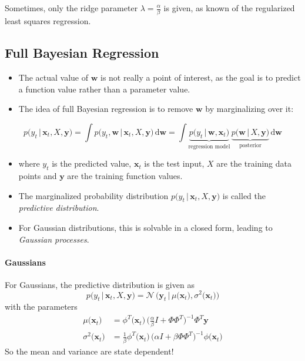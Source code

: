 \documentclass[a4paper, 11pt, accentcolor = tud3b]{tudreport}
\newcommand{\given}{\ensuremath{\,\vert\,}}
\newcommand{\dif}[1]{\ensuremath{\,\mathrm{d}#1}}
\renewcommand{\vec}[1]{\mathbf{#1}}
\begin{document}
				Sometimes, only the ridge parameter \(\lambda = \frac{\alpha}{\beta}\) is given, as known of the regularized least squares regression.

			\subsection{Full Bayesian Regression}
				\begin{itemize}
					\item The actual value of \(\vec{w}\) is not really a point of interest, as the goal is to predict a function value rather than a parameter value.
					\item The idea of full Bayesian regression is to remove \(\vec{w}\) by marginalizing over it:
				\end{itemize}
				\begin{equation}
					p\big(y_t \given \vec{x}_t, X, \vec{y}\big) = \int p\big(y_t, \vec{w} \given \vec{x}_t, X, \vec{y}\big) \dif{\vec{w}} = \int \underbrace{p\big(y_t \given \vec{w}, \vec{x}_t\big)}_\textrm{regression model} \, \underbrace{p\big(\vec{w} \given X, \vec{y}\big)}_\textrm{posterior} \dif{\vec{w}}
				\end{equation}
				\begin{itemize}
					\item[] where \( y_t \) is the predicted value, \( \vec{x}_t \) is the test input, \(X\) are the training data points and \(\vec{y}\) are the training function values.
					\item The marginalized probability distribution \( p\big(y_t \given \vec{x}_t, X, \vec{y}\big) \) is called the \emph{predictive distribution}.
					\item For Gaussian distributions, this is solvable in a closed form, leading to \emph{Gaussian processes}.
				\end{itemize}

				\paragraph{Gaussians}
					For Gaussians, the predictive distribution is given as
					\begin{equation}
						p\big(y_t \given \vec{x}_t, X, \vec{y}\big) = \mathcal{N}\,\Big(\vec{y}_t \given \mu\big(\vec{x}_t\big), \sigma^2\big(\vec{x}_t\big)\Big)
					\end{equation}
					with the parameters
					\begin{align}
						\mu\big(\vec{x}_t\big) &= \phi^T\big(\vec{x}_t\big) \, \Bigg( \frac{\alpha}{\beta} I + \Phi\Phi^T \!\Bigg)^{-1} \Phi^T \vec{y} \\
						\sigma^2\big(\vec{x}_t\big) &= \frac{1}{\beta} \phi^T\big(\vec{x}_t\big) \, \big( \alpha I + \beta\Phi\Phi^T \big)^{-1} \phi\big(\vec{x}_t\big)
					\end{align}
					So the mean and variance are state dependent!
\end{document}
